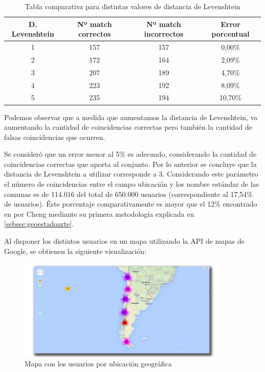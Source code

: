 \begin{table}[H]
	\centering
	\begin{tabular}{| c|c|c|c|}
		\hline
		D. Levenshtein & Nº match correctos & Nº match incorrectos  &  Error porcentual \\ \hline
		1   & 157 & 157 & 0,00\% \\ \hline
		2   & 172 & 164 & 2,09\% \\ \hline
		3	& 207 & 189 & 4,70\% \\ \hline
		4	& 223 & 192 & 8,09\% \\ \hline
		5	& 235 & 194 & 10,70\% \\ \hline
	\end{tabular}
	\caption {Tabla comparativa para distintas valores de distancia de Levenshtein}
\end{table}

Podemos observar que a medida que aumentamos la distancia de Levenshtein, va aumentando la cantidad de coincidencias correctas pero también la cantidad de falsas coincidencias que ocurren.

Se consideró que un error menor al 5\% es adecuado, considerando la cantidad de coincidencias correctas que aporta al conjunto. Por lo anterior se concluye que la distancia de Levenshtein a utilizar corresponde a 3. Considerando este parámetro el número de coincidencias entre el campo ubicación y los nombre estándar de las comunas es de 114.016 del total de 650.000 usuarios (correspondiente al 17,54\% de usuarios). Éste porcentaje comparativamente es mayor que el 12\% encontrado en \cite{Cheng:2010:YYT:1871437.1871535} por Cheng mediante su primera metodología explicada en  \ref{sebsec:geoestadoarte}.

Al disponer los distintos usuarios en un mapa utilizando la API de mapas de Google, se obtienen la siguiente visualización:

\begin{figure}[H]
	\centering
	\includegraphics[width=0.9\textwidth]{imgs/mapa_usuarios.png}
	\caption{Mapa con los usuarios por ubicación geográfica}
	\label{fig:mapa_usuarios}
\end{figure}
